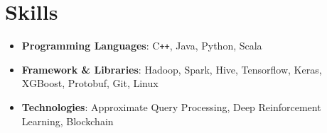 \documentclass[a4paper,11pt]{article}
\begin{document}
\section{Skills}
  \begin{itemize}[leftmargin=*, itemsep=-2pt, label={}]
    \item{
      \textbf{Programming Languages}{: C\texttt{++}, Java, Python, Scala}
    }
    \item{
      \textbf{Framework \& Libraries}{: Hadoop, Spark, Hive, Tensorflow, Keras, XGBoost, Protobuf, Git, Linux}
    }
    \item{
      \textbf{Technologies}{: Approximate Query Processing, Deep Reinforcement Learning, Blockchain}
    }
  \end{itemize}


\end{document}
